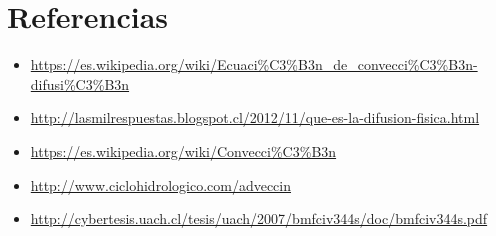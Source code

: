 \documentclass[letterpaper]{article}
\newcommand{\5}
{
\\[.5cm]
}
\begin{document}
\newpage
\section{Referencias}
\begin{itemize}
\item \url{https://es.wikipedia.org/wiki/Ecuaci%C3%B3n_de_convecci%C3%B3n-difusi%C3%B3n}
\item \url{http://lasmilrespuestas.blogspot.cl/2012/11/que-es-la-difusion-fisica.html}
\item \url{https://es.wikipedia.org/wiki/Convecci%C3%B3n}
\item \url{http://www.ciclohidrologico.com/adveccin}
\item \url{http://cybertesis.uach.cl/tesis/uach/2007/bmfciv344s/doc/bmfciv344s.pdf}
\end{itemize}

\newpage
\end{document}
